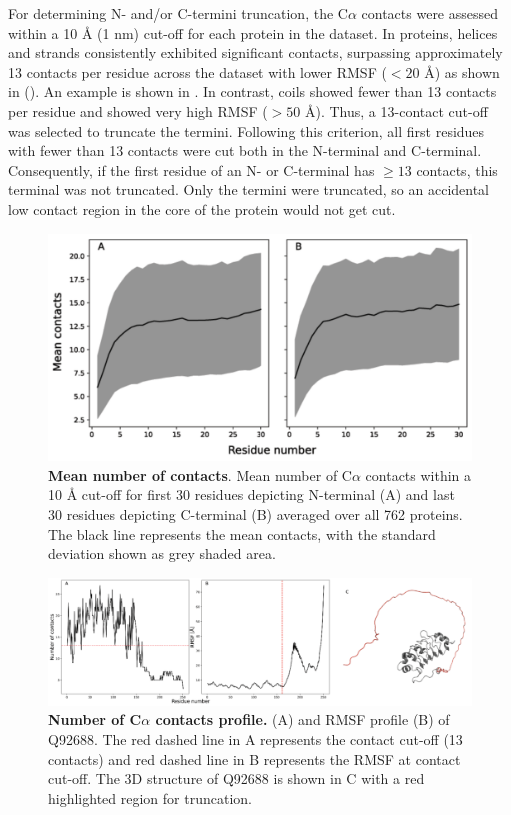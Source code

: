 For determining N- and/or C-termini truncation, the C$\alpha$ contacts were assessed within a 10 Å (1 nm) cut-off for each protein in the dataset. In proteins, helices and strands consistently exhibited significant contacts, surpassing approximately 13 contacts per residue across the dataset with lower RMSF ($<20$ Å) as shown in (). An example is shown in . In contrast, coils showed fewer than 13 contacts per residue and showed very high RMSF ($>50$ Å). Thus, a 13-contact cut-off was selected to truncate the termini.
Following this criterion, all first residues with fewer than 13 contacts were cut both in the N-terminal and C-terminal. Consequently, if the first residue of an N- or C-terminal has $\geq 13$ contacts, this terminal was not truncated. Only the termini were truncated, so an accidental low contact region in the core of the protein would not get cut.


\begin{figure}[H]
    \centering
    \includegraphics[width=\linewidth]{pLDDT//plddt_figures//supplementary_bhawna/supfig14.pdf}
    \caption{\textbf{Mean number of contacts}. Mean number of C$\alpha$ contacts within a 10 Å cut-off for first 30 residues depicting N-terminal (A) and last 30 residues depicting C-terminal (B) averaged over all 762 proteins. The black line represents the mean contacts, with the standard deviation shown as grey shaded area.}
    \label{fig:plddt_sup:sup14}
\end{figure}

\begin{figure}[H]
    \centering
    \includegraphics[width=\linewidth]{pLDDT//plddt_figures//supplementary_bhawna/supfig15.pdf}
    \caption{\textbf{Number of C$\alpha$ contacts profile.} (A) and RMSF profile (B) of Q92688. The red dashed line in A represents the contact cut-off (13 contacts) and red dashed line in B represents the RMSF at contact cut-off. The 3D structure of Q92688 is shown in C with a red highlighted region for truncation.}
    \label{fig:plddt_sup:sup15}
\end{figure}

